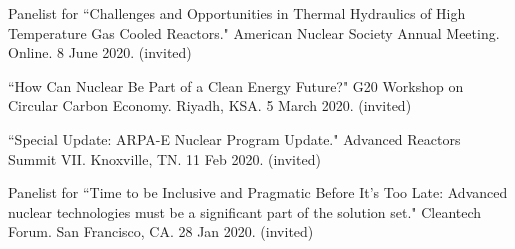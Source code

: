 \begin{bibsection}

\item Panelist for ``Challenges and Opportunities in Thermal
Hydraulics of High Temperature Gas Cooled Reactors." American Nuclear Society Annual Meeting. Online. 8 June 2020. (invited)



\item ``How Can Nuclear Be Part of a Clean Energy Future?" G20
Workshop on Circular Carbon Economy. Riyadh, KSA. 5 March 2020. (invited)

\item ``Special Update: ARPA-E Nuclear Program Update." Advanced Reactors Summit VII. Knoxville, TN. 11 Feb 2020.
(invited)




\item Panelist for ``Time to be Inclusive and Pragmatic Before It’s Too Late: Advanced nuclear technologies must be a significant part of the solution set." Cleantech Forum. San Francisco, CA. 28 Jan 2020.
(invited)




\end{bibsection}
